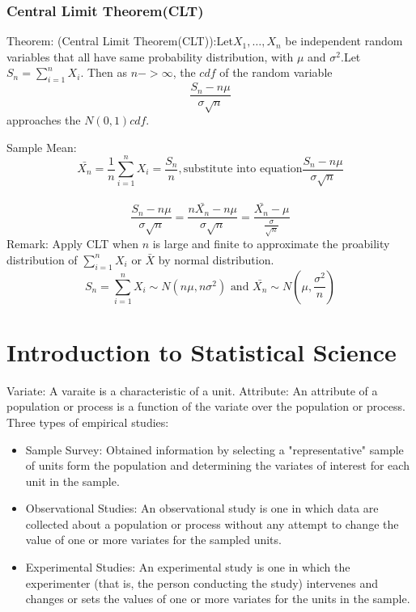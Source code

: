 \documentclass{article}
\newcommand{\sqr}[1]{{#1}^2}
\begin{document}
\subsubsection{Central Limit Theorem(CLT)}
Theorem: (Central Limit Theorem(CLT)):Let$X_1, \dotsc, X_n$ be independent random variables that all have same probability distribution, with $\mu$ and $\sqr{\sigma}$.Let $S_n = \sum_{i=1}^{n}X_i$. Then as $n -> \infty$, the $cdf$ of the random variable
$$\frac{S_n - n\mu}{\sigma \sqrt{n}}$$
approaches the $N(0, 1) cdf$.

\noindent Sample Mean: $$\bar{X_n} = \frac{1}{n}\sum_{i=1}^{n}X_i = \frac{S_n}{n}, \text{substitute into equation} \frac{S_n - n\mu}{\sigma\sqrt{n}} $$\\
$$\frac{S_n - n\mu}{\sigma \sqrt{n}} = \frac{n \bar{X_n} - n \mu}{\sigma \sqrt{n}} = \frac{\bar{X_n} - \mu}{\frac{\sigma}{\sqrt{n}}}$$
Remark: Apply CLT when $n$ is large and finite to approximate the proability distribution of $\sum_{i=1}^{n}X_i$ or $\bar{X}$ by normal distribution.
$$S_n = \sum_{i=1}^{n}X_i \sim N(n\mu, n\sqr{\sigma}) \text{ and } \bar{X_n} \sim N(\mu, \frac{\sqr{\sigma}}{n})$$







\section{Introduction to Statistical Science}
Variate: A varaite is a characteristic of a unit.
Attribute: An attribute of a population or process is a function of the variate over the population or process.
Three types of empirical studies:
\begin{itemize}
    \item Sample Survey: Obtained information by selecting a "representative" sample of units form the population and determining the variates of interest for each unit in the sample.
    \item Observational Studies: An observational study is one in which data are collected about a population or process without any attempt to change the value of one or more variates for the sampled units. 
    \item Experimental Studies: An experimental study is one in which the experimenter (that is, the person conducting the study) intervenes and changes or sets the values of one or more variates for the units in the sample. 
\end{itemize}
\end{document}
